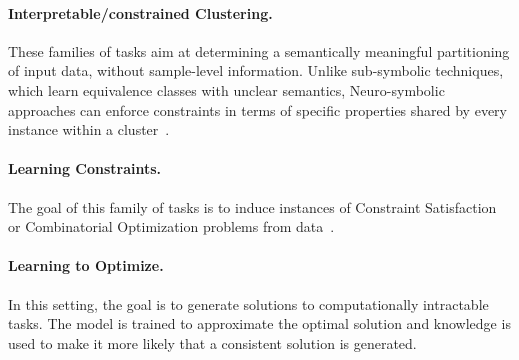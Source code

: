 \paragraph{Interpretable/constrained Clustering.} These families of tasks aim at determining a semantically meaningful partitioning of input data, without sample-level information. Unlike sub-symbolic techniques, which learn equivalence classes with unclear semantics, Neuro-symbolic approaches can enforce constraints in terms of specific properties shared by every instance within a cluster~\cite{ciravegna2023logic}.%

\paragraph{Learning Constraints.} The goal of this family of tasks is to induce instances of Constraint Satisfaction or Combinatorial Optimization problems from data~\cite{de2018learning,fajemisin2023optimization}.

\paragraph{Learning to Optimize.}
In this setting, the goal is to generate solutions to computationally intractable tasks. The model is trained to approximate the optimal solution and knowledge is used to make it more likely that a consistent solution is generated.



